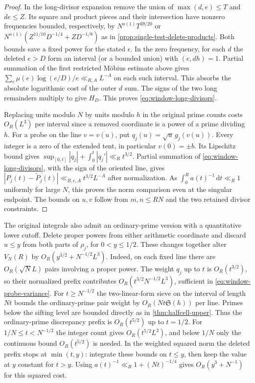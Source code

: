 \documentclass[11pt,a4paper]{article}
\numberwithin{equation}{section}
\newcommand{\SSS}{\mathfrak S}
\newcommand{\ud}{\mathrm d}
\begin{document}
\begin{proof}
In the long-divisor expansion remove the union of
$\max(d,e)\le T$ and $de\le Z$. Its square and product pieces
and their intersection have nonzero frequencies bounded, respectively,
by $N^{o(1)}T^{39/20}$ or
$N^{o(1)}(Z^{11/10}D^{-1/4}+ZD^{-1/8})$ as in
\cref{prop:single-test-delete-products}. Both bounds save a
fixed power for the stated $\epsilon$. In the zero frequency,
for each $d$ the deleted $e>D$ form an interval (or a bounded
union) with $(e,dh)=1$. Partial summation of the first restricted
M\"obius estimate above gives
$\sum_e\mu(e)\log(e/D)/e\ll_{R,A}L^{-A}$ on each such interval.
This absorbs the absolute logarithmic cost of the outer $d$ sum.
The signs of the two long remainders multiply to give $H_D$.
This proves \cref{eq:window-long-divisors}.

Replacing units modulo $N$ by units modulo $h$ in the original
prime counts costs $O_R(L^3)$ per interval since a removed
coordinate is a power of a prime dividing $h$. For a probe on
the line $v=v(u)$, put $q_j(u)=\sqrt u\,g_j(v(u))$. Every
integer is a zero of the extended tent, in particular $v(0)=\pm b$.
Its Lipschitz bound gives $\sup_{[0,t]}|q_j|+
\int_0^t|q_j'|\ll_R t^{3/2}$. Partial summation of
\cref{eq:window-long-divisors}, with the sign of the oriented
line, gives $|P_j(t)-\widetilde P_j(t)|\ll_{R,\epsilon,A}
t^{3/2}L^{-A}$ after normalization. As $\int_0^R a(t)^{-1}
\,\ud t\ll_R1$ uniformly for large $N$, this proves the norm
comparison even at the singular endpoint. The bounds on $u,v$
follow from $m,n\le RN$ and the two retained divisor constraints.
\end{proof}

The original integrals also admit an ordinary-prime version with
a quantitative lower cutoff. Delete proper powers from either
arithmetic coordinate and discard $u\le y$ from both parts of
$\rho_j$, for $0<y\le1/2$. These changes together alter $V_N(R)$
by $O_R(y^{3/2}+N^{-1/2}L^3)$. Indeed, on each fixed line
there are $O_R(\sqrt N L)$ pairs involving a proper power.
The weight $q_j$ up to $t$ is $O_R(t^{3/2})$, so their normalized
prefix contributes $O_R(t^{3/2}N^{-1/2}L^3)$, sufficient in
\cref{eq:window-probe-variance}. For $t\ge N^{-1/2}$ the
two-linear-form sieve on the interval of length $Nt$ bounds
the ordinary-prime pair weight by $O_R(Nt\SSS(h))$ per line.
Primes below the sifting level are bounded directly as in
\cref{thm:halfcell-upper}. Thus the ordinary-prime discrepancy
prefix is $O_R(t^{5/2})$ up to $t=1/2$. For $1/N\le t<N^{-1/2}$
the integer count gives $O_R(t^{5/2}L^2)$, and below $1/N$
only the continuous bound $O_R(t^{5/2})$ is needed.
In the weighted squared norm the deleted prefix stops at
$\min(t,y)$: integrate these bounds on $t\le y$, then keep the
value at $y$ constant for $t>y$. Using $a(t)^{-1}\ll_R
1+(Nt)^{-1/4}$ gives $O_R(y^3+N^{-1})$ for this squared cost.
\end{document}
